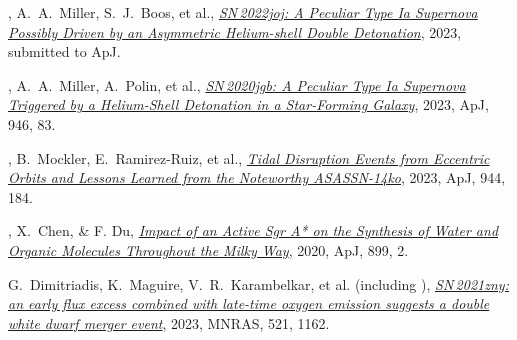 


\begin{cvpubs}


\cvpub
{ %
\begin{cvitems}
\item {{\bf \color{darktext}{C.~Liu}}, A.~A.~Miller, S.~J.~Boos, et al., \href{https://arxiv.org/abs/2308.06319}{\textit{SN\,2022joj: A Peculiar Type Ia Supernova Possibly Driven by an Asymmetric Helium-shell Double Detonation}}, 2023, submitted to ApJ.}
\item {{\bf \color{darktext}{C.~Liu}}, A.~A.~Miller, A.~Polin, et al., \href{https://iopscience.iop.org/article/10.3847/1538-4357/acbb5e/meta}{\textit{SN\,2020jgb: A Peculiar Type Ia Supernova Triggered by a Helium-Shell Detonation in a Star-Forming Galaxy}}, 2023, ApJ, 946, 83.}
\item {{\bf \color{darktext}{C.~Liu}}, B.~Mockler, E.~Ramirez-Ruiz, et al., \href{https://iopscience.iop.org/article/10.3847/1538-4357/acafe1}{\textit{Tidal Disruption Events from Eccentric Orbits and Lessons Learned from the Noteworthy ASASSN-14ko}}, 2023, ApJ, 944, 184.}
\item {{\bf \color{darktext}{C.~Liu}}, X.~Chen, \& F. Du, \href{https://iopscience.iop.org/article/10.3847/1538-4357/aba758}{\textit{Impact of an Active Sgr A* on the Synthesis of Water and Organic Molecules Throughout the Milky Way}}, 2020, ApJ, 899, 2.}
\item {G.~Dimitriadis, K.~Maguire, V.~R.~Karambelkar, et al. (including {\bf \color{darktext}{C.~Liu}}), \href{https://academic.oup.com/mnras/article-abstract/521/1/1162/7059222?redirectedFrom=fulltext}{\textit{SN\,2021zny: an early flux excess combined with late-time oxygen emission suggests a double white dwarf merger event}}, 2023, MNRAS, 521, 1162.}
\end{cvitems}
}


\end{cvpubs}